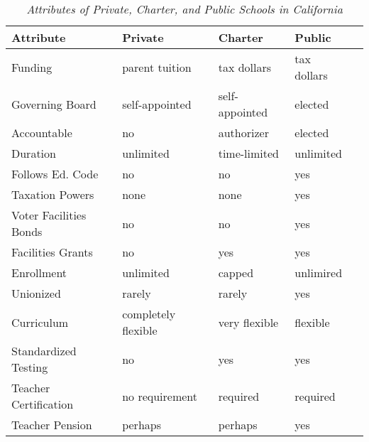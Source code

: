 \begin{table}[ht]
  \caption[Attributes of Private, Charter, and Public Schools in California]{\textit{Attributes of Private, Charter, and Public Schools in California}}\label{tab:school_attributes}%
  \begin{tabularx}{\textwidth}{lllll}
    \toprule
    \textbf{Attribute}     & \textbf{Private}    & \textbf{Charter} & \textbf{Public}               \\
    \midrule
    Funding                & parent tuition      & tax dollars      & tax dollars      \vspace{1ex} \\
    Governing Board        & self-appointed      & self-appointed   & elected          \vspace{1ex} \\
    Accountable            & no                  & authorizer       & elected          \vspace{1ex} \\
    Duration               & unlimited           & time-limited     & unlimited        \vspace{1ex} \\
    Follows Ed. Code       & no                  & no               & yes              \vspace{1ex} \\
    Taxation Powers        & none                & none             & yes              \vspace{1ex} \\
    Voter Facilities Bonds & no                  & no               & yes              \vspace{1ex} \\
    Facilities Grants      & no                  & yes              & yes              \vspace{1ex} \\
    Enrollment             & unlimited           & capped           & unlimired        \vspace{1ex} \\
    Unionized              & rarely              & rarely           & yes              \vspace{1ex} \\
    Curriculum             & completely flexible & very flexible    & flexible         \vspace{1ex} \\
    Standardized Testing   & no                  & yes              & yes              \vspace{1ex} \\
    Teacher Certification  & no requirement      & required         & required         \vspace{1ex} \\
    Teacher Pension        & perhaps             & perhaps          & yes                           \\
    \bottomrule
  \end{tabularx}
\end{table}

